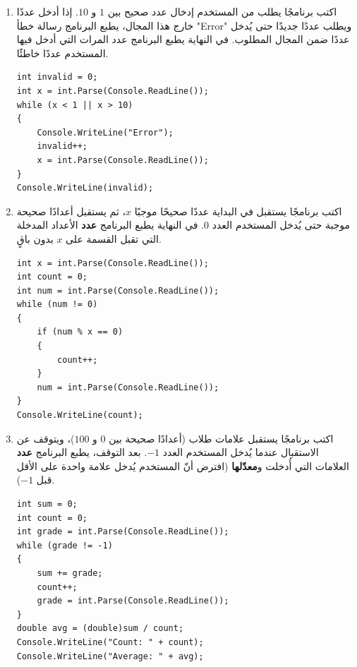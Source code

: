 \documentclass[14pt]{extarticle}
\begin{document}
\begin{enumerate}[resume, itemsep=1em]
\item اكتب برنامجًا يطلب من المستخدم إدخال عدد صحيح بين $1$ و $10$. إذا أدخل عددًا خارج هذا المجال، يطبع البرنامج رسالة خطأ \textenglish{"Error"} ويطلب عددًا جديدًا حتى يُدخل عددًا ضمن المجال المطلوب. في النهاية يطبع البرنامج عدد المرات التي أدخل فيها المستخدم عددًا خاطئًا.
\ifwithsols
\begin{boxSolution}
\begin{english}
\begin{verbatim}
int invalid = 0;
int x = int.Parse(Console.ReadLine());
while (x < 1 || x > 10)
{
    Console.WriteLine("Error");
    invalid++;
    x = int.Parse(Console.ReadLine());
}
Console.WriteLine(invalid);
\end{verbatim}
\end{english}
\end{boxSolution}
\fi
\filbreak

\item اكتب برنامجًا يستقبل في البداية عددًا صحيحًا موجبًا $x$، ثم يستقبل أعدادًا صحيحة موجبة حتى يُدخل المستخدم العدد $0$. في النهاية يطبع البرنامج \textbf{عدد} الأعداد المدخلة التي تقبل القسمة على $x$ بدون باقٍ.
\ifwithsols
\begin{boxSolution}
\begin{english}
\begin{verbatim}
int x = int.Parse(Console.ReadLine());
int count = 0;
int num = int.Parse(Console.ReadLine());
while (num != 0)
{
    if (num % x == 0)
    {
        count++;
    }
    num = int.Parse(Console.ReadLine());
}
Console.WriteLine(count);
\end{verbatim}
\end{english}
\end{boxSolution}
\fi
\filbreak

\item اكتب برنامجًا يستقبل علامات طلاب (أعدادًا صحيحة بين $0$ و $100$)، ويتوقف عن الاستقبال عندما يُدخل المستخدم العدد $-1$. بعد التوقف، يطبع البرنامج \textbf{عدد} العلامات التي أُدخلت و\textbf{معدّلها} (افترض أنّ المستخدم يُدخل علامة واحدة على الأقل قبل $-1$).
\ifwithsols
\begin{boxSolution}
\begin{english}
\begin{verbatim}
int sum = 0;
int count = 0;
int grade = int.Parse(Console.ReadLine());
while (grade != -1)
{
    sum += grade;
    count++;
    grade = int.Parse(Console.ReadLine());
}
double avg = (double)sum / count;
Console.WriteLine("Count: " + count);
Console.WriteLine("Average: " + avg);
\end{verbatim}
\end{english}
\end{boxSolution}
\fi
\filbreak

\end{enumerate}
\end{document}
